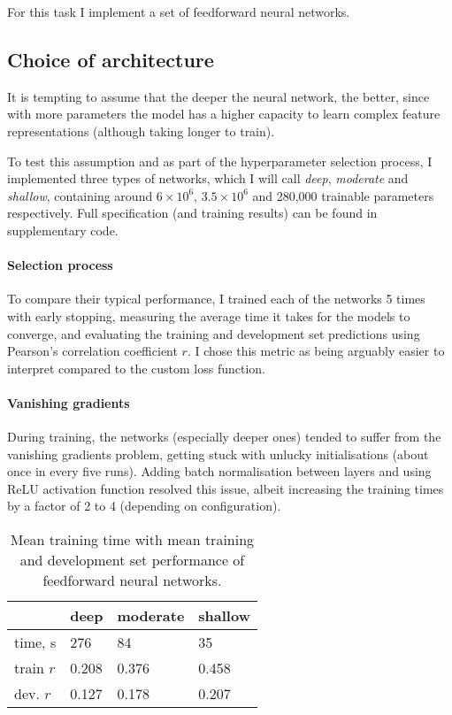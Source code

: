 \documentclass[10pt, twocolumn]{article}
\begin{document}
For this task I implement a set of feedforward neural networks.

\subsection{Choice of architecture}
It is tempting to assume that the deeper the neural network, the better, since with more parameters the model has a higher capacity to learn complex feature representations (although taking longer to train). 

To test this assumption and as part of the hyperparameter selection process, I implemented three types of networks, which I will call \textit{deep}, \textit{moderate} and \textit{shallow}, containing around $6\times 10^6$, $3.5\times 10^6$ and 280,000 trainable parameters respectively. Full specification (and training results) can be found in supplementary code. 

\paragraph{Selection process} To compare their typical performance, I trained each of the networks 5 times with early stopping, measuring the average time it takes for the models to converge, and evaluating the training and development set predictions using Pearson's correlation coefficient $r$. I chose this metric as being arguably easier to interpret compared to the custom loss function.

\paragraph{Vanishing gradients} During training, the networks (especially deeper ones) tended to suffer from the vanishing gradients problem, getting stuck with unlucky initialisations (about once in every five runs). Adding batch normalisation between layers and using ReLU activation function resolved this issue, albeit increasing the training times by a factor of 2 to 4 (depending on configuration). 

\begin{table}[]
	\begin{tabularx}{\linewidth}{XXXX}
		\hline
				& \textbf{deep} & \textbf{moderate} & \textbf{shallow}\\ \hline
		time, s     & 276   & 84  & 35 \\
		train $r$ & 0.208 & 0.376 & 0.458 \\
		dev. $r$ & 0.127 & 0.178 & 0.207
		\end{tabularx}
\caption{Mean training time with mean training and development set performance of feedforward neural networks.}\label{g1}
\end{table}
\end{document}
